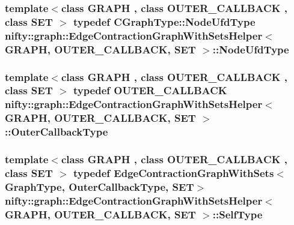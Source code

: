 \subsubsection[{Node\+Ufd\+Type}]{\setlength{\rightskip}{0pt plus 5cm}template$<$class G\+R\+A\+P\+H , class O\+U\+T\+E\+R\+\_\+\+C\+A\+L\+L\+B\+A\+C\+K , class S\+E\+T $>$ typedef {\bf C\+Graph\+Type\+::\+Node\+Ufd\+Type} {\bf nifty\+::graph\+::\+Edge\+Contraction\+Graph\+With\+Sets\+Helper}$<$ G\+R\+A\+P\+H, O\+U\+T\+E\+R\+\_\+\+C\+A\+L\+L\+B\+A\+C\+K, S\+E\+T $>$\+::{\bf Node\+Ufd\+Type}}\label{structnifty_1_1graph_1_1EdgeContractionGraphWithSetsHelper_a254e8886638750a06342b813be34344d}
\hypertarget{structnifty_1_1graph_1_1EdgeContractionGraphWithSetsHelper_a3e0b97cbc8de91c57e3dc83860edda69}{}
\subsubsection[{Outer\+Callback\+Type}]{\setlength{\rightskip}{0pt plus 5cm}template$<$class G\+R\+A\+P\+H , class O\+U\+T\+E\+R\+\_\+\+C\+A\+L\+L\+B\+A\+C\+K , class S\+E\+T $>$ typedef O\+U\+T\+E\+R\+\_\+\+C\+A\+L\+L\+B\+A\+C\+K {\bf nifty\+::graph\+::\+Edge\+Contraction\+Graph\+With\+Sets\+Helper}$<$ G\+R\+A\+P\+H, O\+U\+T\+E\+R\+\_\+\+C\+A\+L\+L\+B\+A\+C\+K, S\+E\+T $>$\+::{\bf Outer\+Callback\+Type}}\label{structnifty_1_1graph_1_1EdgeContractionGraphWithSetsHelper_a3e0b97cbc8de91c57e3dc83860edda69}
\hypertarget{structnifty_1_1graph_1_1EdgeContractionGraphWithSetsHelper_a7b0578f3509ed396dd72b029e4e8b105}{}
\subsubsection[{Self\+Type}]{\setlength{\rightskip}{0pt plus 5cm}template$<$class G\+R\+A\+P\+H , class O\+U\+T\+E\+R\+\_\+\+C\+A\+L\+L\+B\+A\+C\+K , class S\+E\+T $>$ typedef {\bf Edge\+Contraction\+Graph\+With\+Sets}$<${\bf Graph\+Type}, {\bf Outer\+Callback\+Type}, S\+E\+T$>$ {\bf nifty\+::graph\+::\+Edge\+Contraction\+Graph\+With\+Sets\+Helper}$<$ G\+R\+A\+P\+H, O\+U\+T\+E\+R\+\_\+\+C\+A\+L\+L\+B\+A\+C\+K, S\+E\+T $>$\+::{\bf Self\+Type}}\label{structnifty_1_1graph_1_1EdgeContractionGraphWithSetsHelper_a7b0578f3509ed396dd72b029e4e8b105}
\hypertarget{structnifty_1_1graph_1_1EdgeContractionGraphWithSetsHelper_acc1b924a2b02648491b614c8d69ca9fb}{}
